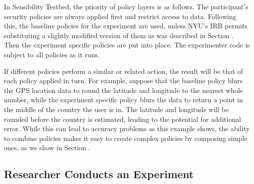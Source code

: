 
In Sensibility Testbed, the priority of policy layers is as follows.  
The participant's security policies are always applied first and restrict
access to data.  Following this, the baseline policies for the experiment
are used, unless NYU's IRB permits substituting a slightly modified version
of them as was described in Section .  Then the experiment specific
policies are put into place.  The experimenter code is subject to all
policies as it runs.

If different policies perform a similar or related action, the result will
be that of each policy applied in turn.  For example, suppose that the
baseline policy blurs the GPS location data to round the latitude and longitude
to the nearest whole number, while the experiment specific policy blurs the
data to return a point in the middle of the country the user is in.  
The latitude and longitude will be rounded before the country is estimated, 
leading to the potential for additional error.  While this can lead to 
accuracy problems as this example shows, the ability to combine policies
makes it easy to create complex policies by composing simple ones,
as we show in Section .


\subsection{Researcher Conducts an Experiment}\label{sec-emt}

